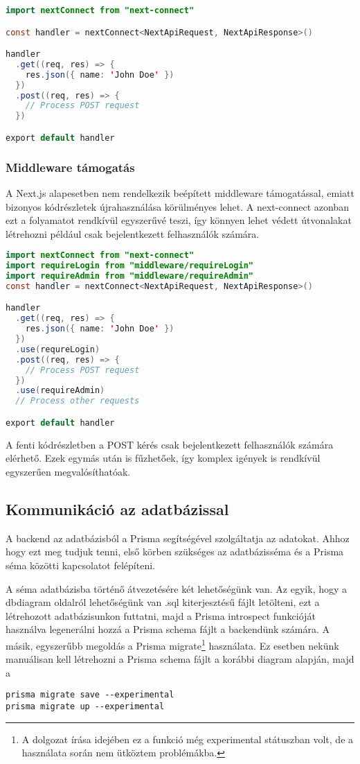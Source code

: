 \begin{lstlisting}[language=Java, caption=Kérés kezelése next-connect segítségével]
import nextConnect from "next-connect"

const handler = nextConnect<NextApiRequest, NextApiResponse>()

handler
  .get((req, res) => {
    res.json({ name: 'John Doe' })
  })
  .post((req, res) => {
    // Process POST request
  })

export default handler
\end{lstlisting}

\subsubsection{Middleware támogatás}
A Next.js alapesetben nem rendelkezik beépített middleware támogatással, emiatt bizonyos kódrészletek újrahasználása körülményes lehet.
A next-connect azonban ezt a folyamatot rendkívül egyszerűvé teszi, így könnyen lehet védett útvonalakat létrehozni például csak bejelentkezett
felhasználók számára.

\begin{lstlisting}[language=Java, caption=Middleware kezelés next-connect segítségével]
import nextConnect from "next-connect"
import requireLogin from "middleware/requireLogin"
import requireAdmin from "middleware/requireAdmin"
const handler = nextConnect<NextApiRequest, NextApiResponse>()

handler
  .get((req, res) => {
    res.json({ name: 'John Doe' })
  })
  .use(requreLogin)
  .post((req, res) => {
    // Process POST request
  })
  .use(requireAdmin)
  // Process other requests

export default handler
\end{lstlisting}

A fenti kódrészletben a POST kérés csak bejelentkezett felhasználók számára elérhető. Ezek egymás után is fűzhetőek, így komplex
igények is rendkívül egyszerűen megvalósíthatóak.


\subsection{Kommunikáció az adatbázissal}

A backend az adatbázisból a Prisma segítségével szolgáltatja az adatokat. Ahhoz hogy ezt meg tudjuk tenni, első körben szükséges az
adatbázisséma és a Prisma séma közötti kapcsolatot felépíteni.

A séma adatbázisba történő átvezetésére két lehetőségünk van. Az egyik, hogy a dbdiagram oldalról lehetőségünk van .sql kiterjesztésű fájlt letölteni,
ezt a létrehozott adatbázisunkon futtatni, majd a Prisma introspect funkcióját használva legenerálni hozzá a Prisma schema fájlt a backendünk számára.
A másik, egyszerűbb megoldás a Prisma migrate\footnote{A dolgozat írása idejében ez a funkció  még experimental státuszban volt, de a használata során nem ütköztem problémákba.} használata.
Ez esetben nekünk manuálisan kell létrehozni a Prisma schema fájlt a korábbi diagram alapján, majd a
\begin{lstlisting}
prisma migrate save --experimental
prisma migrate up --experimental
\end{lstlisting}

